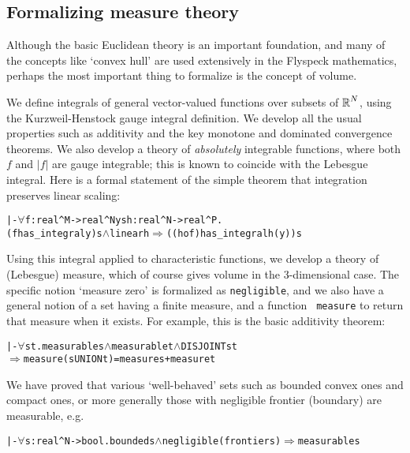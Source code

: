 \documentclass[11pt]{amsart}
\def\sz{small} %
\newcommand{\real}{\mbox{$\protect\mathbb R$}}
\let\And=\wedge                    %
\newcommand{\Imp}{\Rightarrow}
\begin{document}
\subsection*{Formalizing measure theory}

Although the basic Euclidean theory is an important foundation, and many of the
concepts like `convex hull' are used extensively in the Flyspeck mathematics,
perhaps the most important thing to formalize is the concept of volume.

We define integrals of general vector-valued functions over subsets of
$\real^N$, using the Kurzweil-Henstock gauge integral definition. We develop
all the usual properties such as additivity and the key monotone and dominated
convergence theorems. We also develop a theory of {\em absolutely} integrable
functions, where both $f$ and $|f|$ are gauge integrable; this is known to
coincide with the Lebesgue integral. Here is a formal statement of the simple
theorem that integration preserves linear scaling:

\begin{\sz}
\begin{alltt}
|- \(\forall\)f:real^M->real^N y s h:real^N->real^P.
        (f has_integral y) s \(\And\) linear h \(\Imp\) ((h o f) has_integral h(y)) s
\end{alltt}
\end{\sz}

Using this integral applied to characteristic functions, we develop a theory of
(Lebesgue) measure, which of course gives volume in the 3-dimensional case. The
specific notion `measure zero' is formalized as {\tt negligible}, and we also
have a general notion of a set having a finite measure, and a function {\tt
measure} to return that measure when it exists. For example, this is the basic
additivity theorem:

\begin{\sz}
\begin{alltt}
|- \(\forall\)s t. measurable s \(\And\) measurable t \(\And\) DISJOINT s t
         \(\Imp\) measure(s UNION t) = measure s + measure t
\end{alltt}
\end{\sz}

We have proved that various `well-behaved' sets such as bounded convex ones and
compact ones, or more generally those with negligible frontier (boundary) are
measurable, e.g.

\begin{\sz}
\begin{alltt}
|- \(\forall\)s:real^N->bool. bounded s \(\And\) negligible(frontier s) \(\Imp\) measurable s
\end{alltt}
\end{\sz}
\end{document}
